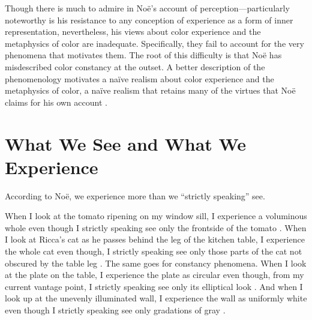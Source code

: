 \documentclass[12pt]{article}
\begin{document}
Though there is much to admire in Noë's account of perception---particularly noteworthy is his resistance to any conception of experience as a form of inner representation, nevertheless, his views about color experience and the metaphysics of color are inadequate. Specifically, they fail to account for the very phenomena that motivates them. The root of this difficulty is that Noë has misdescribed color constancy at the outset. A better description of the phenomenology motivates a naïve realism about color experience and the metaphysics of color, a naïve realism that retains many of the virtues that Noë claims for his own account \citep[see][for similar suggestions]{Allen:2008kx,Campbell:2008nx}.


\section{What We See and What We Experience}\label{sec:the_problem_of_perceptual_presence} %

According to Noë, we experience more than we ``strictly speaking'' see. 

When I look at the tomato ripening on my window sill, I experience a voluminous whole even though I strictly speaking see only the frontside of the tomato \citep[76]{Noe:2004fk}. When I look at Ricca's cat as he passes behind the leg of the kitchen table, I experience the whole cat even though, I strictly speaking see only those parts of the cat not obscured by the table leg \citep[60]{Noe:2004fk}. The same goes for constancy phenomena. When I look at the plate on the table, I experience the plate as circular even though, from my current vantage point, I strictly speaking see only its elliptical look \citep[78--79]{Noe:2004fk}. And when I look up at the unevenly illuminated wall, I experience the wall as uniformly white even though I strictly speaking see only gradations of gray \citep[127]{Noe:2004fk}. 
\end{document}
